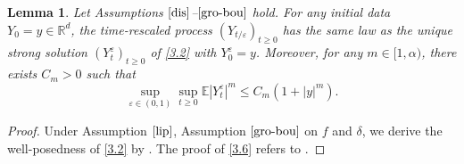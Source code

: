 \documentclass[11pt,reqno]{amsart}
\newtheorem{lemma}{\indent Lemma}[section]
\numberwithin{equation}{section}
\begin{document}
\begin{lemma}\label{T32}
	Let Assumptions $\ref{dis}$--$\ref{gro-bou}$ hold.
For any initial data $Y_0=y\in\mathbb{R}^{d}$, the time-rescaled process
$(Y_{t/\varepsilon})_{t\geq0}$ has the same law as the unique strong
solution $(Y_t^\varepsilon)_{t\geq0}$ of \eqref{3.2} with
$Y_0^\varepsilon=y$.
Moreover, for any $m\in[1,\alpha)$, there exists
	$C_m>0$ %
	such that
	\begin{equation}\label{3.6}
		\sup_{\varepsilon\in(0,1)}
		\sup_{t\geq0}\mathbb{E}|Y_t^\varepsilon|^m
		\leq C_m(1+|y|^m).
	\end{equation}
\end{lemma}
\begin{proof}
	Under Assumption $\ref{lip}$,  Assumption $\ref{gro-bou}$ on $f$ and $\delta$,	we derive the well-posedness of \eqref{3.2} by \cite[Theorem 6.2.3, Theorem 6.2.9, Theorem 6.2.11]{DA}. The proof of \eqref{3.6} refers to \cite[Lemma A.1]{SXX}.	
	

\end{proof}
\end{document}
